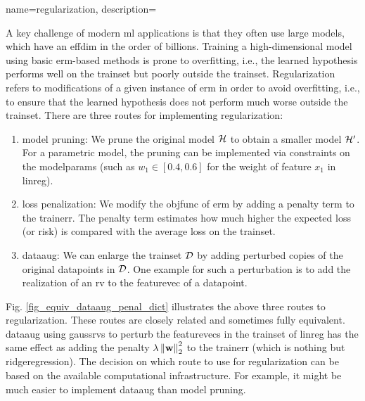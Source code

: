 {name={regularization}, 
	description={A key challenge of modern \gls{ml} applications is that they often 
		use large \glspl{model}, which have an \gls{effdim} in the order of billions. 
		Training a high-dimensional \gls{model} using basic \gls{erm}-based methods
		is prone to \gls{overfitting}, i.e., the learned \gls{hypothesis} performs well on the \gls{trainset} 
		but poorly outside the \gls{trainset}. Regularization refers to modifications of a given instance 
		of \gls{erm} in order to avoid \gls{overfitting}, i.e., to ensure that the learned \gls{hypothesis} does 
		not perform much worse outside the \gls{trainset}. There are three routes for implementing 
		regularization: 
		\begin{enumerate}[label=\arabic*)]
			\item {\Gls{model} pruning:} We prune the original \gls{model} $\mathcal{H}$ to obtain a 
			smaller \gls{model} $\mathcal{H}'$. For a parametric \gls{model}, the pruning can be 
			implemented via constraints on the \glspl{modelparam} (such as $w_{1} \in [0.4,0.6]$ for 
			the weight of \gls{feature} $x_{1}$ in \gls{linreg}).
			\item {\Gls{loss} penalization:} We modify the \gls{objfunc} of \gls{erm} by adding a 
			penalty term to the \gls{trainerr}. The penalty term estimates how much higher the expected \gls{loss} (or \gls{risk}) 
			is compared with the average \gls{loss} on the \gls{trainset}. 
			\item {\Gls{dataaug}:} We can enlarge the \gls{trainset} $\mathcal{D}$ by adding 
			perturbed copies of the original \glspl{datapoint} in $\mathcal{D}$. One example for such 
			a perturbation is to add the \gls{realization} of an \gls{rv} to the \gls{featurevec} 
			of a \gls{datapoint}. 
		\end{enumerate} 
		Fig. \ref{fig_equiv_dataaug_penal_dict} illustrates the above three routes to regularization. 
		These routes are closely related and sometimes fully equivalent. \Gls{dataaug} using \glspl{gaussrv} 
		to perturb the \glspl{featurevec} in the \gls{trainset} of \gls{linreg} 
		has the same effect as adding the penalty 
		$\lambda \left\Vert {{\bf w}} \right\Vert_{2}^2$ to the \gls{trainerr} (which is nothing but \gls{ridgeregression}). 
        		The decision on which route to use for regularization can be based on the 
        		available computational infrastructure. For example, it might be much easier to 
        		implement \gls{dataaug} than \gls{model} pruning. 
		\begin{figure}[H]

\end{figure}}}
